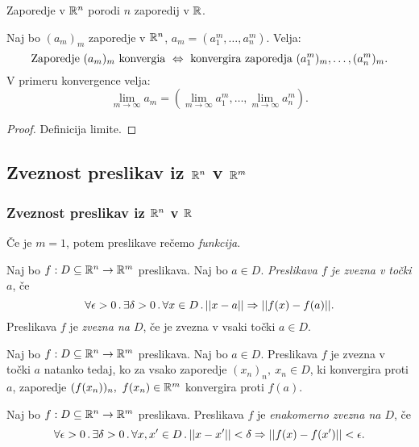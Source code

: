 \begin{opomba}
    Zaporedje v $\mathbb{R}^n$ porodi $n$ zaporedij v $\mathbb{R}$.
\end{opomba}

\begin{trditev}
    Naj bo $(a_m)_m$ zaporedje v $\mathbb{R}^n$, $a_m = (a_1^m, \ldots, a_n^m)$. Velja:
    $$\text{Zaporedje } (a_m)_m \text{ konvergia } \Leftrightarrow \text{ konvergira zaporedja } (a_1^m)_m, \ldots, (a_n^m)_m.$$
    V primeru konvergence velja:
    $$\lim_{m \to \infty} a_m = (\lim_{m \to \infty} a_1^m, \ldots, \lim_{m \to \infty} a_n^m).$$
\end{trditev}

\begin{proof}
    Definicija limite.
\end{proof}

\newpage
\subsection{Zveznost preslikav iz $\mathbb{R}^n$ v $\mathbb{R}^m$}
\subsubsection{Zveznost preslikav iz $\mathbb{R}^n$ v $\mathbb{R}$}

\begin{definicija}
    Če je $m=1$, potem preslikave rečemo \emph{funkcija}.
\end{definicija}

\begin{definicija}
    Naj bo $f: D \subseteq \mathbb{R}^n \to \mathbb{R}^m$ preslikava. Naj bo $a \in D$. \emph{Preslikava $f$ je zvezna v točki $a$}, če 
    $$\forall \epsilon > 0 \,.\, \exists \delta >0 \,.\, \forall x \in D \,.\, ||x-a|| \Rightarrow ||f(x)- f(a)||.$$
    Preslikava $f$ je \emph{zvezna na $D$}, če je zvezna v vsaki točki $a \in D$.
\end{definicija}

\begin{trditev}
    Naj bo $f: D \subseteq \mathbb{R}^n \to \mathbb{R}^m$ preslikava. Naj bo $a \in D$. Preslikava $f$ je zvezna v točki $a$ natanko tedaj, ko za vsako zaporedje $(x_n)_n, \ x_n \in D$, ki konvergira proti $a$, zaporedje $(f(x_n))_n, \ f(x_n) \in \mathbb{R}^m$ konvergira proti $f(a)$.
\end{trditev}

\begin{definicija}
    Naj bo $f: D \subseteq \mathbb{R}^n \to \mathbb{R}^m$ preslikava. Preslikava $f$ je \emph{enakomerno zvezna na $D$}, če
    $$\forall \epsilon > 0 \,.\, \exists \delta > 0 \,.\, \forall x, x' \in D \,.\, ||x - x'|| < \delta \Rightarrow ||f(x) - f(x')|| < \epsilon.$$
\end{definicija}

